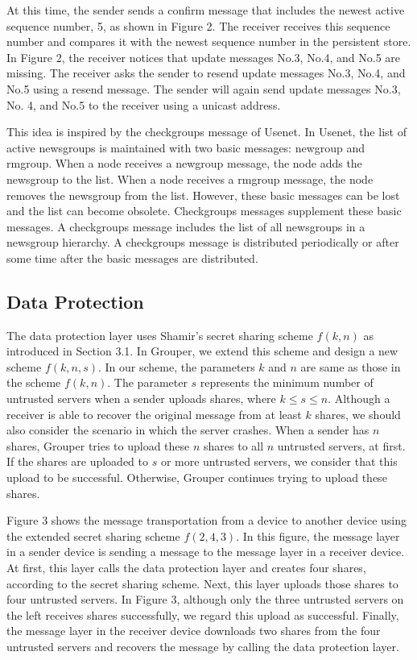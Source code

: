 \documentclass[sigconf]{acmart}
\begin{document}
At this time, the sender sends a confirm message that includes the newest active sequence number, 5, as shown in Figure 2.
The receiver receives this sequence number and compares it with the newest sequence number in the persistent store.
In Figure 2, the receiver notices that update messages No.3, No.4, and No.5 are missing.
The receiver asks the sender to resend update messages No.3, No.4, and No.5 using a resend message.
The sender will again send update messages No.3, No. 4, and No.5 to the receiver using a unicast address.

This idea is inspired by the checkgroups message of Usenet\cite{usenet}.
In Usenet, the list of active newsgroups is maintained with two basic messages: newgroup and rmgroup.
When a node receives a newgroup message, the node adds the newsgroup to the list.
When a node receives a rmgroup message, the node removes the newsgroup from the list.
However, these basic messages can be lost and the list can become obsolete.
Checkgroups messages supplement these basic messages.
A checkgroups message includes the list of all newsgroups in a newsgroup hierarchy.
A checkgroups message is distributed periodically or after some time after the basic messages are distributed.

\subsection{Data Protection}

The data protection layer uses Shamir's secret sharing scheme $f(k, n)$ as introduced in Section 3.1.
In Grouper, we extend this scheme and design a new scheme $ f(k, n, s)$.
In our scheme, the parameters $k$ and $n$ are same as those in the scheme $f(k, n)$. 
The parameter $s$ represents the minimum number of untrusted servers when a sender uploads shares, where $k \leq s \leq n$.
Although a receiver is able to recover the original message from at least $k$ shares, we should also consider the scenario in which the server crashes. 
When a sender has $n$ shares, Grouper tries to upload these $n$ shares to all $n$ untrusted servers, at first. 
If the shares are uploaded to $s$ or more untrusted servers, we consider that this upload to be successful.
Otherwise, Grouper continues trying to upload these shares.

Figure 3 shows the message transportation from a device to another device using the extended secret sharing scheme $f(2, 4, 3)$.
In this figure, the message layer in a sender device is sending a message to the message layer in a receiver device.
At first, this layer calls the data protection layer and creates four shares, according to the secret sharing scheme.
Next, this layer uploads those shares to four untrusted servers.
In Figure 3, although only the three untrusted servers on the left receives shares successfully, we regard this upload as successful.
Finally, the message layer in the receiver device downloads two shares from the four untrusted servers and recovers the message by calling the data protection layer.
\end{document}
